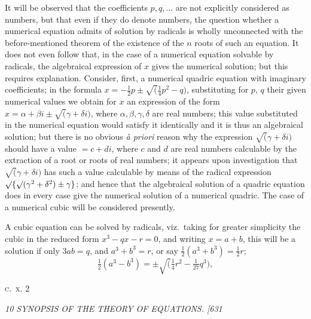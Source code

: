\documentclass[12pt,a4paper]{article}
\begin{document}
It will be observed that the coefficients $p, q, \ldots$ are not explicitly considered as numbers, but that even if they do denote numbers, the question whether a numerical equation admits of solution by radicals is wholly unconnected with the before-mentioned theorem of the existence of the $n$ roots of such an equation. It does not even follow that, in the case of a numerical equation solvable by radicals, the algebraical expression of $x$ gives the numerical solution; but this requires explanation. Consider, first, a numerical quadric equation with imaginary coefficients; in the formula $x = -\tfrac{1}{2}p \pm \surd(\tfrac{1}{4}p^2 - q)$, substituting for $p$, $q$ their given numerical values we obtain for $x$ an expression of the form $x = \alpha + \beta i \pm \surd(\gamma + \delta i)$, where $\alpha, \beta, \gamma, \delta$ are real numbers; this value substituted in the numerical equation would satisfy it identically and it is thus an algebraical solution; but there is no obvious \textit{\`a priori} reason why the expression $\surd(\gamma + \delta i)$ should have a value $= c + d i$, where $c$ and $d$ are real numbers calculable by the extraction of a root or roots of real numbers; it appears upon investigation that $\surd(\gamma + \delta i)$ has such a value calculable by means of the radical expression $\surd\{\surd(\gamma^2 + \delta^2) \pm \gamma\}$; and hence that the algebraical solution of a quadric equation does in every case give the numerical solution of a numerical quadric. The case of a numerical cubic will be considered presently.

A cubic equation can be solved by radicals, viz.\ taking for greater simplicity the cubic in the reduced form $x^3 - q x - r = 0$, and writing $x = a + b$, this will be a solution if only $3 a b = q$, and $a^3 + b^3 = r$, or say $\tfrac{1}{2}(a^3 + b^3) = \tfrac{1}{2}r$;
\[
\tfrac{1}{2}(a^3 - b^3) = \pm \surd(\tfrac{1}{4}r^2 - \tfrac{1}{27}q^3),
\]

\hfill\textsc{c.~x.} \hfill 2

\clearpage
\setcounter{page}{10}

\begin{center}
\textit{10 \hfill SYNOPSIS OF THE THEORY OF EQUATIONS. \hfill [631}
\end{center}
\end{document}
